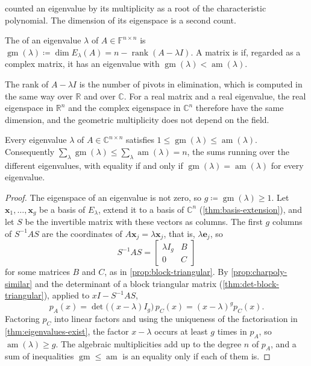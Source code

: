  counted an eigenvalue by its multiplicity as a root of the characteristic polynomial. The dimension of its eigenspace is a second count.

\begin{definition}
\label{def:multiplicities}
The  of an eigenvalue $\lambda$ of $A\in\mathbb F^{n\times n}$ is $\operatorname{gm}(\lambda)\coloneqq\dim E_\lambda(A)=n-\operatorname{rank}(A-\lambda I)$. A matrix is  if, regarded as a complex matrix, it has an eigenvalue with $\operatorname{gm}(\lambda)<\operatorname{am}(\lambda)$.
\end{definition}

The rank of $A-\lambda I$ is the number of pivots in elimination, which is computed in the same way over $\mathbb R$ and over $\mathbb C$. For a real matrix and a real eigenvalue, the real eigenspace in $\mathbb R^n$ and the complex eigenspace in $\mathbb C^n$ therefore have the same dimension, and the geometric multiplicity does not depend on the field.

\begin{theorem}
\label{thm:gm-am}
Every eigenvalue $\lambda$ of $A\in\mathbb C^{n\times n}$ satisfies $1\le\operatorname{gm}(\lambda)\le\operatorname{am}(\lambda)$. Consequently $\sum_\lambda\operatorname{gm}(\lambda)\le\sum_\lambda\operatorname{am}(\lambda)=n$, the sums running over the different eigenvalues, with equality if and only if $\operatorname{gm}(\lambda)=\operatorname{am}(\lambda)$ for every eigenvalue.
\end{theorem}

\begin{proof}
The eigenspace of an eigenvalue is not zero, so $g\coloneqq\operatorname{gm}(\lambda)\ge1$. Let $\mathbf x_1,\ldots,\mathbf x_g$ be a basis of $E_\lambda$, extend it to a basis of $\mathbb C^n$ (\cref{thm:basis-extension}), and let $S$ be the invertible matrix with these vectors as columns. The first $g$ columns of $S^{-1}AS$ are the coordinates of $A\mathbf x_j=\lambda\mathbf x_j$, that is, $\lambda\mathbf e_j$, so
\[
S^{-1}AS=\begin{bmatrix}\lambda I_g&B\\0&C\end{bmatrix}
\]
for some matrices $B$ and $C$, as in \cref{prop:block-triangular}. By \cref{prop:charpoly-similar} and the determinant of a block triangular matrix (\cref{thm:det-block-triangular}), applied to $xI-S^{-1}AS$,
\[
p_A(x)=\det\bigl((x-\lambda)I_g\bigr)\,p_C(x)=(x-\lambda)^gp_C(x).
\]
Factoring $p_C$ into linear factors and using the uniqueness of the factorisation in \cref{thm:eigenvalues-exist}, the factor $x-\lambda$ occurs at least $g$ times in $p_A$, so $\operatorname{am}(\lambda)\ge g$. The algebraic multiplicities add up to the degree $n$ of $p_A$, and a sum of inequalities $\operatorname{gm}\le\operatorname{am}$ is an equality only if each of them is.
\end{proof}

